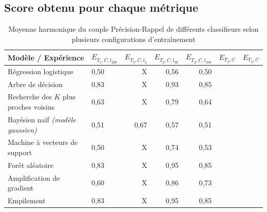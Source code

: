         \subsection{Score obtenu pour chaque métrique}
            \begin{table}[H]
                \centering
                \begin{tabular}{p{}|u|ddd|t|q} \toprule
                    \textbf{Modèle / Expérience} &
                \textbf{$E_{T_1, \overline C, l_{200}}$} & \textbf{$E_{T_2, \overline C, l_2}$} &
                \textbf{$E_{T_2,\overline C, l_{30}}$} & \textbf{$E_{T_2,\overline C, l_{100}}$} & \textbf{
                    $E_{T_3, C}$} & \textbf{$E_{T_4, C}$}
                    \\
                    \midrule
                    Régression logistique & 0,50 & X & 0,56 & 0,50 &  &  \\
                    Arbre de décision & 0,83 & X & 0,93 & 0,85 &  &   \\
                    Recherche des $K$ plus proches voisins & 0,63 & X & 0,79 & 0,64 &  &  \\
                    Bayésien naïf \textit{(modèle gaussien)} & 0,51 & 0,67 & 0,57 & 0,51 &  &   \\
                    Machine à vecteurs de support & 0,50 & X & 0,74 & 0,53 &  &   \\
                    Forêt aléatoire & 0,83 & X & 0,95 & 0,85 &  &  \\
                    Amplification de gradient & 0,60 & X & 0,86 & 0,73 &  &  \\
                    Empilement & 0,83 & X & 0,95 & 0,85 &  &  \\
                    \bottomrule
                \end{tabular}
                \caption{Moyenne harmonique du couple Précision-Rappel de différents classifieurs selon plusieurs configurations d'entraînement}
                \label{tab3:}
            \end{table}


